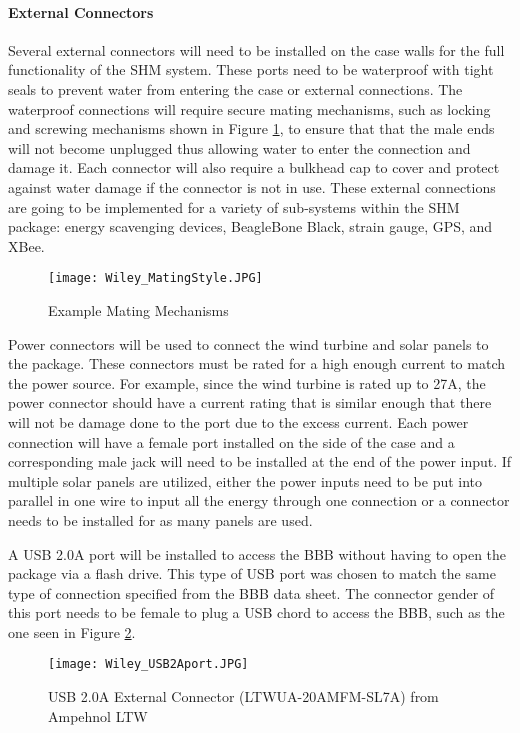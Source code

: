 \paragraph{External Connectors} 
Several external connectors will need to be installed on the case walls for the full functionality of the SHM system. These ports need to be waterproof
with tight seals to prevent water from entering the case or external connections. The waterproof connections will require secure mating mechanisms, such
as locking and screwing mechanisms shown in Figure \ref{fig:BowChicaWowWow}, to ensure that that the male ends will not become unplugged thus allowing
water to enter the connection and damage it. Each connector will also require a bulkhead cap to cover and protect against water damage if the
connector is not in use. These external connections are going to be implemented for a variety of sub-systems within the SHM package: energy
scavenging devices, BeagleBone Black, strain gauge, GPS, and XBee.
\begin{figure}[h]
\centering
\texttt{[image: Wiley\_MatingStyle.JPG]}
\caption{\label{fig:BowChicaWowWow} Example Mating Mechanisms}
\end{figure}

Power connectors will be used to connect the wind turbine and solar panels to the package. These connectors must be rated for a high enough current to
match the power source. For example, since the wind turbine is rated up to 27A, the power connector should have a current rating that is similar enough
that there will not be damage done to the port due to the excess current. Each power connection will have a female port installed on the side of the
case and a corresponding male jack will need to be installed at the end of the power input. If multiple solar panels are utilized, either the power
inputs need to be put into parallel in one wire to input all the energy through one connection or a connector needs to be installed for as many panels
are used. 

A USB 2.0A port will be installed to access the BBB without having to open the package via a flash drive. This type of USB port was chosen to match the
same type of connection specified from the BBB data sheet. The connector gender of this port needs to be female to plug a USB chord to access the BBB,
such as the one seen in Figure \ref{fig:USB}. 
\begin{figure}[h]
\centering
\texttt{[image: Wiley\_USB2Aport.JPG]}
\caption{\label{fig:USB} USB 2.0A External Connector (LTWUA-20AMFM-SL7A) from Ampehnol LTW}
\end{figure}

